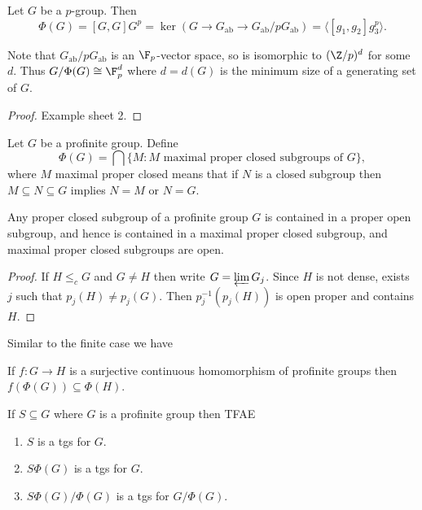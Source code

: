 \documentclass[a4paper]{article}
\begin{document}
\begin{proposition}
  Let \(G\) be a \(p\)-group. Then
  \[
    \Phi(G)
    = [G, G] G^p
    = \ker (G \to G_{\mathrm{ab}} \to G_{\mathrm{ab}}/p G_{\mathrm{ab}})
    = \langle [g_1, g_2] g_3^p \rangle.
  \]
\end{proposition}

Note that \(G_{\mathrm{ab}}/p G_{\mathrm{ab}}\) is an \(\F_p\)-vector space, so is isomorphic to \((\Z/p)^d\) for some \(d\). Thus \(G/\Phi(G) \cong \F_p^d\) where \(d = d(G)\) is the minimum size of a generating set of \(G\).

\begin{proof}
  Example sheet 2.
\end{proof}

\begin{definition}
  Let \(G\) be a profinite group. Define
  \[
    \Phi(G) = \bigcap \{M: M \text{ maximal proper closed subgroups of } G\},
  \]
  where \(M\) maximal proper closed means that if \(N\) is a closed subgroup then \(M \subseteq N \subseteq G\) implies \(N = M\) or \(N = G\).
\end{definition}

\begin{proposition}
  Any proper closed subgroup of a profinite group \(G\) is contained in a proper open subgroup, and hence is contained in a maximal proper closed subgroup, and maximal proper closed subgroups are open.
\end{proposition}

\begin{proof}
  If \(H \leq_c G\) and \(G \ne H\) then write \(G = \varprojlim G_j\). Since \(H\) is not dense, exists \(j\) such that \(p_j(H) \ne p_j(G)\). Then \(p_j^{-1}(p_j(H))\) is open proper and contains \(H\).
\end{proof}

Similar to the finite case we have

\begin{lemma}
  If \(f: G \to H\) is a surjective continuous homomorphism of profinite groups then \(f(\Phi(G)) \subseteq \Phi(H)\).
\end{lemma}

\begin{proposition}
  If \(S \subseteq G\) where \(G\) is a profinite group then TFAE
  \begin{enumerate}
  \item \(S\) is a tgs for \(G\).
  \item \(S \Phi(G)\) is a tgs for \(G\).
  \item \(S \Phi(G)/\Phi(G)\) is a tgs for \(G/\Phi(G)\).
  \end{enumerate}
\end{proposition}
\end{document}
